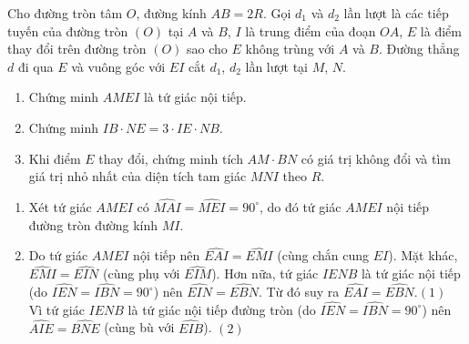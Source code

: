 \begin{bt}%
	Cho đường tròn tâm $O$, đường kính $AB=2R$. Gọi $d_1$ và $d_2$ lần lượt là các tiếp tuyến của đường tròn $(O)$ tại $A$ và $B$, $I$ là trung điểm của đoạn $OA$, $E$ là điểm thay đổi trên đường tròn $(O)$ sao cho $E$ không trùng với $A$ và $B$. Đường thẳng $d$ đi qua $E$ và vuông góc với $EI$ cắt $d_1$, $d_2$ lần lượt tại $M$, $N$.
\begin{enumerate}
	\item Chứng minh $AMEI$ là tứ giác nội tiếp.
	\item Chứng minh $IB\cdot NE=3\cdot IE\cdot NB$.
	\item Khi điểm $E$ thay đổi, chứng minh tích $AM\cdot BN$ có giá trị không đổi và tìm giá trị nhỏ nhất của diện tích tam giác $MNI$ theo $R$.
	\end{enumerate}
	\loigiai
	{
	\begin{enumerate}
	\item Xét tứ giác $AMEI$ có $\widehat{MAI}=\widehat{MEI}=90^\circ$, do đó tứ giác $AMEI$ nội tiếp đường tròn đường kính $MI$.
\begin{center}
\end{center}
	\item Do tứ giác $AMEI$ nội tiếp nên $\widehat{EAI}=\widehat{EMI}$ (cùng chắn cung $EI$). Mặt khác, $\widehat{EMI}=\widehat{EIN}$ (cùng phụ với $\widehat{EIM}$). Hơn nữa, tứ giác $IENB$ là tứ giác nội tiếp (do $\widehat{IEN}=\widehat{IBN}=90^\circ$) nên $\widehat{EIN}=\widehat{EBN}$. Từ đó suy ra $\widehat{EAI}=\widehat{EBN}$.\hfill$(1)$\\
	Vì tứ giác $IENB$ là tứ giác nội tiếp đường tròn (do $\widehat{IEN}=\widehat{IBN}=90^\circ$) nên $\widehat{AIE}=\widehat{BNE}$ (cùng bù với $\widehat{EIB}$). \hfill$(2)$\\

\end{enumerate}}
\end{bt}
